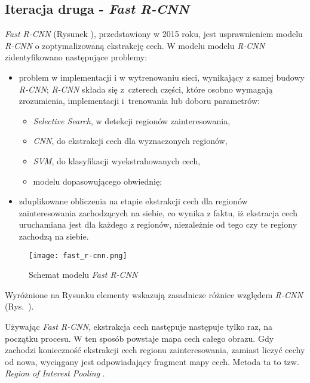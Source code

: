 \subsection{Iteracja druga - \textit{Fast R-CNN}}
\label{sec:fastrcnn}

\textit{Fast R-CNN} \cite{fast-rcnn} (Rysunek ), przedstawiony w 2015 roku, jest usprawnieniem modelu \textit{R-CNN} o zoptymalizowaną ekstrakcję cech. 
W modelu modelu \textit{R-CNN} zidentyfikowano następujące problemy:

\begin{itemize}
  \item problem w implementacji i w wytrenowaniu sieci, wynikający z samej budowy \textit{R-CNN}; \textit{R-CNN} składa się z~czterech części, które osobno wymagają zrozumienia, implementacji i~trenowania lub doboru parametrów:
		\begin{itemize}
			\item \textit{Selective Search}, w detekcji regionów zainteresowania,
			\item \textit{CNN}, do ekstrakcji cech dla wyznaczonych regionów,
			\item \textit{SVM}, do klasyfikacji wyekstrahowanych cech,
			\item modelu dopasowującego obwiednię;
		\end{itemize}
  \item zduplikowane obliczenia na etapie ekstrakcji cech dla regionów zainteresowania zachodzących na siebie, co wynika z faktu, iż ekstracja cech uruchamiana jest dla każdego z regionów, niezależnie od tego czy te regiony zachodzą na siebie.
\end{itemize}

\begin{figure}[h]
  \centering
  \texttt{[image: fast\_r-cnn.png]}
  \caption{Schemat modelu \textit{Fast R-CNN}}
  \label{fig:fast_r_cnn}
\end{figure}

Wyróżnione na Rysunku  elementy wskazują zasadnicze różnice względem \textit{R-CNN} (Rys.~).

Używając \textit{Fast R-CNN}, ekstrakcja cech następuje następuje tylko raz, na początku procesu.
W ten sposób powstaje mapa cech całego obrazu.
Gdy zachodzi konieczność ekstrakcji cech regionu zainteresowania, zamiast liczyć cechy od nowa, wyciągany jest odpowiadający fragment mapy cech.
Metoda ta to tzw. \textit{Region of Interest Pooling} \cite{fast-rcnn}.

